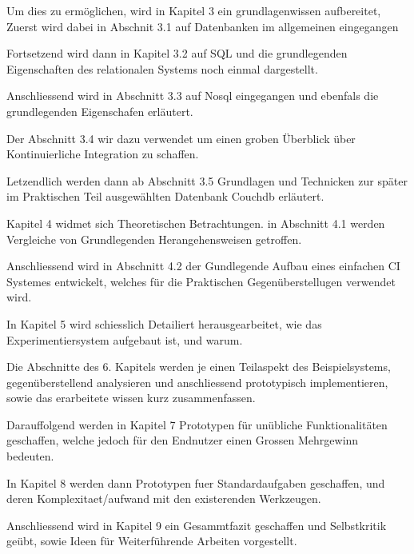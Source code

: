 Um dies zu ermöglichen, wird in Kapitel 3 ein grundlagenwissen aufbereitet,
Zuerst wird dabei in Abschnit 3.1 auf Datenbanken im allgemeinen eingegangen

Fortsetzend wird dann in Kapitel 3.2 auf SQL
und die grundlegenden Eigenschaften des relationalen Systems noch einmal dargestellt.

Anschliessend wird in Abschnitt 3.3 auf Nosql eingegangen
und ebenfals die grundlegenden Eigenschafen erläutert.

Der Abschnitt 3.4 wir dazu verwendet um einen groben Überblick über Kontinuierliche Integration zu schaffen.

Letzendlich werden dann ab Abschnitt 3.5 Grundlagen und Technicken zur später
im Praktischen Teil ausgewählten Datenbank Couchdb erläutert.




Kapitel 4 widmet sich Theoretischen Betrachtungen.
in Abschnitt 4.1 werden Vergleiche von Grundlegenden Herangehensweisen
getroffen.

Anschliessend wird in Abschnitt 4.2 der Gundlegende Aufbau eines einfachen CI Systemes
entwickelt, welches für die Praktischen Gegenüberstellugen verwendet wird.

In Kapitel 5 wird schiesslich Detailiert herausgearbeitet,
wie das Experimentiersystem aufgebaut ist, und warum.

Die Abschnitte des 6. Kapitels werden je einen Teilaspekt des Beispielsystems,
gegenüberstellend analysieren und anschliessend prototypisch implementieren,
sowie das erarbeitete wissen kurz zusammenfassen.

Darauffolgend werden in Kapitel 7 Prototypen für unübliche Funktionalitäten geschaffen,
welche jedoch f\"ur den Endnutzer einen Grossen Mehrgewinn bedeuten.

In Kapitel 8 werden dann Prototypen fuer Standardaufgaben geschaffen,
und deren Komplexitaet/aufwand mit den existerenden Werkzeugen.

Anschliessend wird in Kapitel 9 ein Gesammtfazit geschaffen und Selbstkritik ge\"ubt,
sowie Ideen f\"ur Weiterf\"uhrende Arbeiten vorgestellt.
